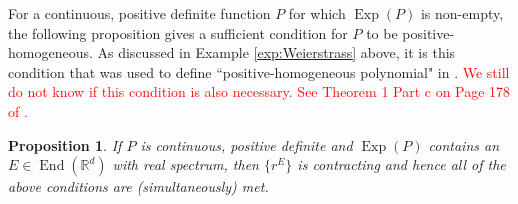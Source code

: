 \documentclass[11pt]{article}
\newtheorem{proposition}[theorem]{Proposition}
\theoremstyle{remark}
\newcommand\End{\operatorname{End}} %
\newcommand\Exp{\operatorname{Exp}}
\begin{document}
\noindent For a continuous, positive definite function $P$ for which $\Exp(P)$ is non-empty, the following proposition gives a sufficient condition for $P$ to be positive-homogeneous. As discussed in Example \ref{exp:Weierstrass} above, it is this condition that was used to define ``positive-homogeneous polynomial" in \cite{Randles2017}. \textcolor{red}{We still do not know if this condition is also necessary. See Theorem 1 Part c on Page 178 of \cite{Braun1993}.}



\begin{proposition}\label{prop:PosHomSufficientCondition}
If $P$ is continuous, positive definite and $\Exp(P)$ contains an $E\in\End(\mathbb{R}^d)$ with real spectrum, then $\{r^E\}$ is contracting and hence all of the above conditions are (simultaneously) met. 
\end{proposition}
\end{document}
